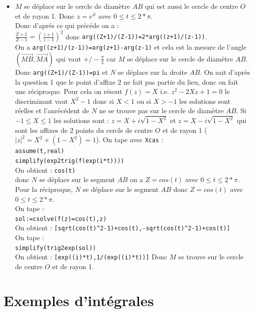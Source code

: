\documentclass[a4paper,11pt]{book}
\begin{document}
\begin{itemize}
\item $M$ se d\'eplace sur le cercle de 
diam\`etre $AB$ qui est aussi le cercle de centre $O$ et de rayon 1. Donc
$z=e^{it}$ avec $0\leq t\leq 2*\pi$.\\
Donc d'apr\'es ce qui pr\'ec\'ede  on a :\\
$\displaystyle \frac{Z+1}{Z-1}=(\frac{z+1}{z-1})^2$
donc {\tt arg((Z+1)/(Z-1))=2*arg((z+1)/(z-1))}.\\
On a  {\tt arg((z+1)/(z-1))=arg(z+1)-arg(z-1)} et cela est la mesure de 
l'angle $(\overrightarrow{MB},\overrightarrow{MA})$ qui vaut 
$+/-\frac{\pi}{2}$ car $M$ se d\'eplace sur le cercle de diam\`etre $AB$.
Donc {\tt arg((Z+1)/(Z-1))=pi} et $N$ se d\'eplace sur la droite $AB$.
On sait d'apr\`es la question 1 que le point d'affixe 2 ne fait pas partie du 
lieu, donc on fait une r\'eciproque. Pour cela on r\'esout $f(z)=X$ i.e.
$z^2-2Xz+1=0$ le discriminant vaut $X^2-1$ donc si $X<1$ ou si $X>-1$ les 
solutions sont r\'eelles et l'anr\'ec\'edent de $N$ ne se trouve pas sur le 
cercle de diam\`etre $AB$. Si  $-1\leq X \leq 1$ les solutions sont :
$z=X+i\sqrt{1-X^2}$ et $z=X-i\sqrt{1-X^2}$ qui sont les affixes de 2 points du cercle de centre $O$ et de rayon 1 ($|z|^2=X^2+(1-X^2)=1$).  
On tape avec {\tt Xcas} :\\
{\tt assume(t,real)}\\
{\tt simplify(exp2trig(f(exp(i*t))))}\\
On obtient : 
{\tt cos(t)}\\
donc $N$ se d\'eplace sur le segment $AB$ on a $Z=cos(t)$  avec 
$0\leq t\leq 2*\pi$.\\
Pour la r\'eciproque, $N$ se d\'eplace sur le segment $AB$ donc $Z=cos(t)$  
avec $0\leq t\leq 2*\pi$.\\
On tape :\\
{\tt sol:=csolve(f(z)=cos(t),z)}\\
On obtient : 
{\tt [sqrt(cos(t)\verb|^|2-1)+cos(t),-sqrt(cos(t)\verb|^|2-1)+cos(t)]}\\
On tape :\\
{\tt simplify(trig2exp(sol))}\\
On obtient : 
{\tt [exp((i)*t),1/(exp((i)*t))]}
Donc $M$ se trouve sur le cercle de centre $O$ et de rayon 1.
\end{itemize}

\chapter{Exemples d'int\'egrales}
\end{document}
